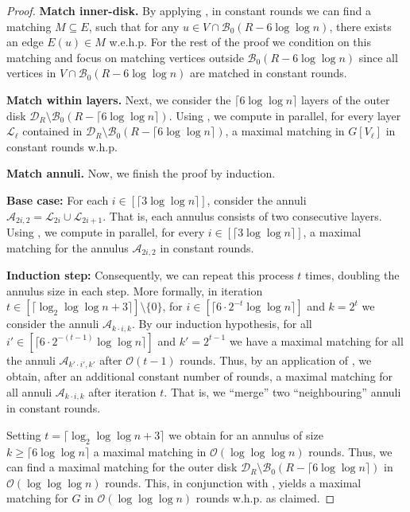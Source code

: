 \documentclass[letterpaper,11pt]{article}
\newcommand{\whp}{w.h.p.\xspace}
\newcommand{\wehp}{w.e.h.p.\xspace}
\newcommand{\B}{\mathcal B}
\newcommand{\disk}{\ensuremath{\mathcal D_R}\xspace}
\newcommand{\1}{\mathbb I}
\newcommand{\bigO}{\mathcal{O}}
\newcommand{\Layer}[1]{\mathcal{L}_{#1}}
\newcommand{\block}[2]{\mathcal{A}_{#1,#2}}
\begin{document}
\begin{proof}
\textbf{Match inner-disk.} By applying , in constant rounds we can find a matching $M \subseteq E$, such that for any $u \in V \cap \B_0(R - 6\log\log n)$, there exists an edge $E(u) \in M$ \wehp For the rest of the proof we condition on this matching and focus on matching vertices outside $ \B_0(R - 6\log\log n)$ since all vertices in $V \cap \B_0(R - 6\log\log n)$ are matched in constant rounds.

\smallskip

\textbf{Match within layers.} Next, we consider the $\lceil 6\log\log n\rceil$ layers of the outer disk $\disk \setminus \B_0(R - \lceil 6\log\log n\rceil)$. Using , we compute in parallel, for every layer $\Layer{\ell}$ contained in $\disk \setminus \B_0(R - \lceil 6\log\log n\rceil)$, a maximal matching in $G[V_\ell]$ in constant rounds \whp

\smallskip

\textbf{Match annuli.} Now, we finish the proof by induction.

\smallskip

\textbf{Base case:} For each $i \in [\lceil 3 \log\log n\rceil]$, consider the annuli
%
$
    \mathcal{A}_{2i,2} = \Layer{2i} \cup \Layer{2i+1}.
$
%
That is, each annulus consists of two consecutive layers. Using
, we compute in parallel, for every $i \in [\lceil 3
\log\log n\rceil]$, a maximal matching for the annulus $\mathcal{A}_{2i,2}$ in constant rounds.

\textbf{Induction step:} Consequently, we can repeat this process $t$ times, doubling the annulus size in each step. More formally, in iteration $t \in [\lceil \log_2\log\log n + 3 \rceil] \setminus\{0\}$, for $i \in [\lceil 6\cdot 2^{-t} \log\log n\rceil]$ and $k = 2^t$ we consider the annuli $\block{k \cdot i}{k}$. By our induction hypothesis, for all $i' \in [\lceil 6\cdot 2^{-(t-1)} \log\log n\rceil]$ and $k' = 2^{t-1}$ we have a maximal matching for all the annuli $\block{k' \cdot i'}{k'}$ after $\bigO(t-1)$ rounds. Thus, by an application of , we obtain, after an additional constant number of rounds, a maximal matching for all annuli $\block{k \cdot i}{k}$ after iteration $t$. That is, we ``merge'' two ``neighbouring'' annuli in constant rounds.

Setting $t= \lceil \log_2\log\log n + 3 \rceil $ we obtain for an annulus of size $k\geq \lceil 6\log\log n\rceil$ a maximal matching in $\bigO(\log\log\log n)$ rounds. Thus, we can find a maximal matching for the outer disk $\disk \setminus \B_0(R - \lceil 6\log\log n\rceil)$ in $\bigO(\log\log\log n)$ rounds. This, in conjunction with , yields a maximal matching for $G$ in $\bigO(\log\log\log n)$ rounds \whp as claimed.
\end{proof}
    
\end{document}
